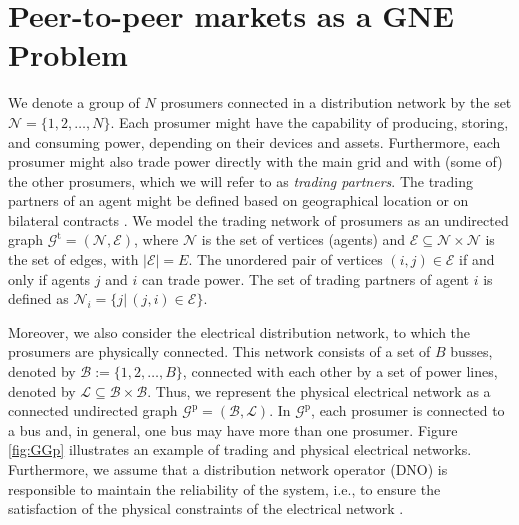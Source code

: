 \documentclass{IEEEtran}  %
\newcommand{\mc}{\mathcal}
\newcommand{\0}{\mathbf{0}}
\newcommand{\1}{\mathbf{1}}
\begin{document}
\section{Peer-to-peer markets as a GNE Problem}
\label{sub:setup}

We denote a group of $N$ prosumers connected in a distribution network by the set $\mc N = \{1,2,\dots, N \}$. Each prosumer might have the capability of producing, storing, and consuming power, depending on their devices and assets. Furthermore, each prosumer might also trade power directly with the main grid and with (some of) the other prosumers, which we will refer to as \textit{trading partners}. The trading partners of an agent might be defined based on geographical location or on bilateral contracts \cite{sousa2019}. 
%
We model the trading network of prosumers as an undirected graph  $\mc G^{\mathrm{t}} =(\mc N,\mc E)$, where $\mc N $ is the set of vertices (agents) and $\mc E \subseteq \mc N \times \mc N$ is the set of edges, with $|\mc E |= E$. The unordered pair of vertices $(i,j) \in \mc E$ if and only if agents $j$ and $i$ can trade power. The set of trading partners of agent $i$ is defined as $ \mc N_i = \{ j | \, (j,i)\in \mc E \}$.   


Moreover, we also consider the electrical distribution network, to which the prosumers are physically connected. This network consists of a set of $B$ busses, denoted by $\mc B:=\{1,2,\dots,B\}$, connected with each other by a set of power lines, denoted by $\mc L\subseteq \mc B \times \mc B$. Thus, we represent the physical electrical network as a connected undirected graph $\mc G^{\mathrm{p}}=(\mc B, \mc L)$. In $\mc G^{\mathrm{p}}$, each prosumer  is connected to a bus and, in general, one bus may have more than one prosumer. Figure \ref{fig:GGp} illustrates an example of trading and physical electrical networks. Furthermore, we assume that a distribution network operator (DNO) is responsible to maintain the reliability of the system, i.e., to ensure the satisfaction of the physical constraints of the electrical network \cite{qin2018,morstyn2019,moret2020}. 
\color{black}
\end{document}
